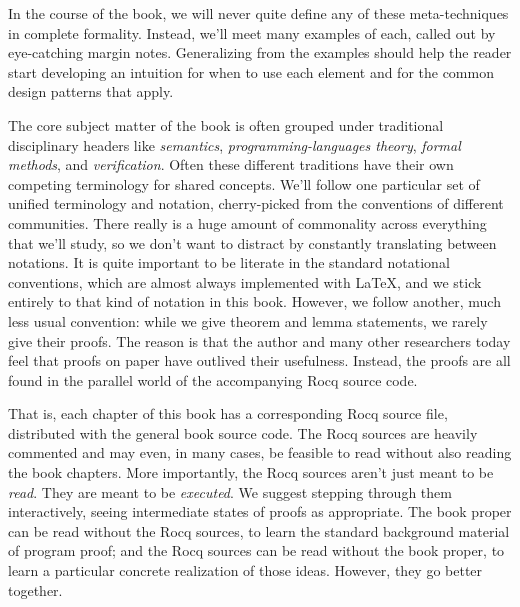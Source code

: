 \documentclass{amsbook}
\theoremstyle{definition}
\theoremstyle{remark}
\numberwithin{section}{chapter}
\numberwithin{equation}{chapter}
\begin{document}
\newcommand{\encoding}[0]{\marginpar{\fbox{\textbf{Encoding}}}}

In the course of the book, we will never quite define any of these meta-techniques in complete formality.
Instead, we'll meet many examples of each, called out by eye-catching margin notes.
Generalizing from the examples should help the reader start developing an intuition for when to use each element and for the common design patterns that apply.

The core subject matter of the book is often grouped under traditional disciplinary headers like \emph{semantics}, \emph{programming-languages theory}, \emph{formal methods}, and \emph{verification}.
Often these different traditions have their own competing terminology for shared concepts.
We'll follow one particular set of unified terminology and notation, cherry-picked from the conventions of different communities.
There really is a huge amount of commonality across everything that we'll study, so we don't want to distract by constantly translating between notations.
It is quite important to be literate in the standard notational conventions, which are almost always implemented with \index{\LaTeX{}}\LaTeX{}, and we stick entirely to that kind of notation in this book.
However, we follow another, much less usual convention: while we give theorem and lemma statements, we rarely give their proofs.
The reason is that the author and many other researchers today feel that proofs on paper have outlived their usefulness.
Instead, the proofs are all found in the parallel world of the accompanying Rocq source code.

That is, each chapter of this book has a corresponding Rocq source file, distributed with the general book source code.
The Rocq sources are heavily commented and may even, in many cases, be feasible to read without also reading the book chapters.
More importantly, the Rocq sources aren't just meant to be \emph{read}.
They are meant to be \emph{executed}.
We suggest stepping through them interactively, seeing intermediate states of proofs as appropriate.
The book proper can be read without the Rocq sources, to learn the standard background material of program proof; and the Rocq sources can be read without the book proper, to learn a particular concrete realization of those ideas.
However, they go better together.


\end{document}
